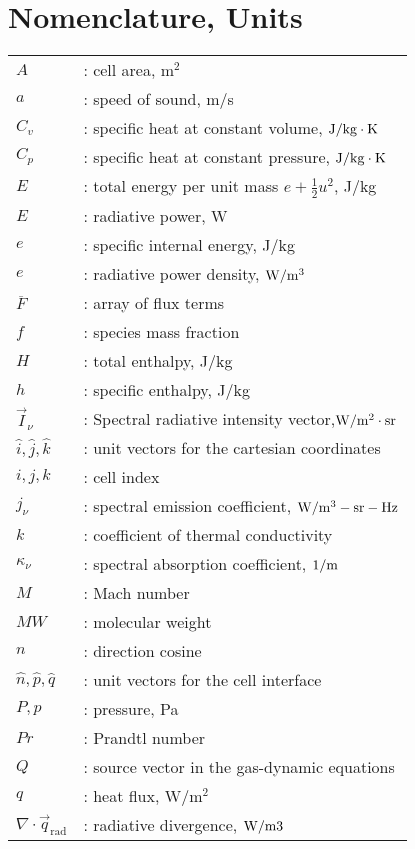 \documentclass[12pt,a4paper,twoside]{article}
\begin{document}
\section*{Nomenclature, Units}
%
\begin{tabular}{ll}
$A$	& : cell area, m$^2$ \\
$a$	& : speed of sound, m/s \\
$C_v$	& : specific heat at constant volume, $\rm J/kg \cdot K$ \\
$C_p$	& : specific heat at constant pressure, $\rm J/kg \cdot K$ \\
$E$	& : total energy per unit mass $e + \frac{1}{2} u^2$, J/kg \\
$E$  & : radiative power, W \\
$e$	& : specific internal energy, J/kg \\
$e$  & : radiative power density, $\rm W/m^3$ \\
$\overline{F}$ & : array of flux terms \\
$f$            & : species mass fraction \\
$H$	& : total enthalpy, J/kg \\
$h$            & : specific enthalpy, J/kg \\
$\vec{I}_\nu$     & : Spectral radiative intensity vector,$\rm W/m^2 \cdot sr$ \\
$\hat{i}, 
 \hat{j},
 \hat{k}$      & : unit vectors for the cartesian coordinates \\
$i,j,k$	& : cell index \\
$j_\nu$     & : spectral emission coefficient, $\rm W/m^3-sr-Hz$ \\
$k$            & : coefficient of thermal conductivity \\
$\kappa_\nu$ & : spectral absorption coefficient, $\rm 1/m$ \\
$M$	& : Mach number \\
$MW$	& : molecular weight \\
$n$            & : direction cosine \\
$\hat{n}, 
 \hat{p},
 \hat{q}$      & : unit vectors for the cell interface \\
$P, p$	& : pressure, Pa \\
$Pr$	& : Prandtl number \\
$Q$	& : source vector in the gas-dynamic equations \\
$q$     & : heat flux, W/m$^2$ \\
$\nabla \cdot \vec{q}_\text{rad}$  & : radiative divergence, $\rm W/m3$ \\

\end{tabular}
\end{document}
